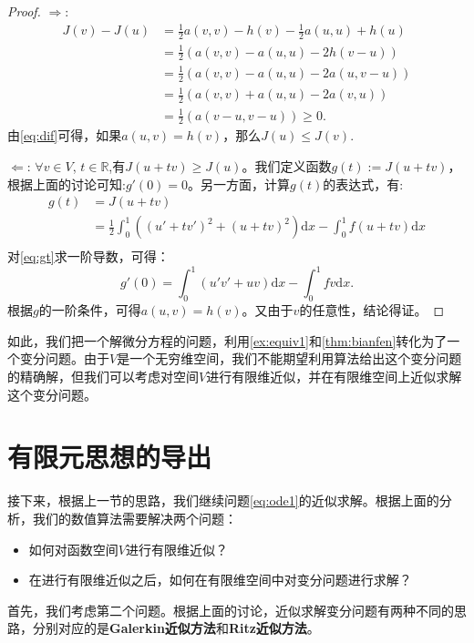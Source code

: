 \documentclass[lang=cn,10pt,newtx]{elegantbook}
\newcommand{\dif}{\mathrm{d}}
\begin{document}
\begin{proof}
  $\Rightarrow$:
  \begin{equation}
    \label{eq:dif}
    \begin{aligned}
      J(v)-J(u)&=\frac{1}{2}a(v,v)-h(v)-\frac{1}{2}a(u,u)+h(u)\\
      &=\frac{1}{2}(a(v,v)-a(u,u)-2h(v-u))\\
      &=\frac{1}{2}(a(v,v)-a(u,u)-2a(u,v-u))\\
      &=\frac{1}{2}(a(v,v)+a(u,u)-2a(v,u))\\
      &=\frac{1}{2}(a(v-u,v-u))\ge0.
    \end{aligned}
  \end{equation}
  由\eqref{eq:dif}可得，如果$a(u,v)=h(v)$，那么$J(u)\le J(v)$.

  $\Leftarrow$: $\forall v\in V$, $t\in\mathbb{R}$,有$J(u+tv)\ge J(u)$。我们定义函数$g(t):=J(u+tv)$，根据上面的讨论可知:$g'(0)=0$。另一方面，计算$g(t)$的表达式，有:
  \begin{equation}
    \begin{aligned}
      \label{eq:gt}
      g(t)&=J(u+tv)\\
      &=\frac{1}{2}\int_{0}^{1}((u'+tv'
      )^{2}+(u+tv)^{2})\dif x-\int_{0}^{1}f(u+tv)\dif x\\
    \end{aligned}
  \end{equation}
  对\eqref{eq:gt}求一阶导数，可得：
  \begin{equation}
    \label{eq:dirg0}
    g'(0)=\int_{0}^{1}(u'v'+uv)\dif x-\int_{0}^{1}fv\dif x.
  \end{equation}
  根据$g$的一阶条件，可得$a(u,v)=h(v)$。又由于$v$的任意性，结论得证。
\end{proof}

如此，我们把一个解微分方程的问题，利用\ref{ex:equiv1}和\ref{thm:bianfen}转化为了一个变分问题。由于$V$是一个无穷维空间，我们不能期望利用算法给出这个变分问题的精确解，但我们可以考虑对空间$V$进行有限维近似，并在有限维空间上近似求解这个变分问题。

\section{有限元思想的导出}
接下来，根据上一节的思路，我们继续问题\eqref{eq:ode1}的近似求解。根据上面的分析，我们的数值算法需要解决两个问题：
\begin{itemize}
  \item 如何对函数空间$V$进行有限维近似？
  \item 在进行有限维近似之后，如何在有限维空间中对变分问题进行求解？
\end{itemize}
首先，我们考虑第二个问题。根据上面的讨论，近似求解变分问题有两种不同的思路，分别对应的是\textbf{Galerkin近似方法}和\textbf{Ritz近似方法}。
\end{document}
